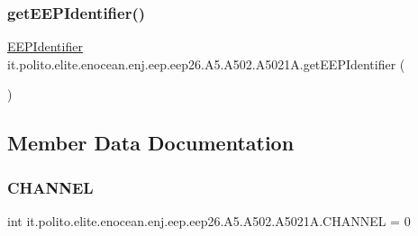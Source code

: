 \subsubsection{\texorpdfstring{get\+E\+E\+P\+Identifier()}{getEEPIdentifier()}}
{\footnotesize\ttfamily \hyperlink{classit_1_1polito_1_1elite_1_1enocean_1_1enj_1_1eep_1_1_e_e_p_identifier}{E\+E\+P\+Identifier} it.\+polito.\+elite.\+enocean.\+enj.\+eep.\+eep26.\+A5.\+A502.\+A5021\+A.\+get\+E\+E\+P\+Identifier (\begin{DoxyParamCaption}{ }\end{DoxyParamCaption})}



\subsection{Member Data Documentation}
\hypertarget{classit_1_1polito_1_1elite_1_1enocean_1_1enj_1_1eep_1_1eep26_1_1_a5_1_1_a502_1_1_a5021_a_a681331c7aa2e780e3ef77c34780dee58}{}\label{classit_1_1polito_1_1elite_1_1enocean_1_1enj_1_1eep_1_1eep26_1_1_a5_1_1_a502_1_1_a5021_a_a681331c7aa2e780e3ef77c34780dee58} 
\subsubsection{\texorpdfstring{C\+H\+A\+N\+N\+EL}{CHANNEL}}
{\footnotesize\ttfamily int it.\+polito.\+elite.\+enocean.\+enj.\+eep.\+eep26.\+A5.\+A502.\+A5021\+A.\+C\+H\+A\+N\+N\+EL = 0\hspace{0.3cm}{\ttfamily [static]}}

\hypertarget{classit_1_1polito_1_1elite_1_1enocean_1_1enj_1_1eep_1_1eep26_1_1_a5_1_1_a502_1_1_a5021_a_ab5dd84df89eb9d7f8c6e9b7981e0f284}{}\label{classit_1_1polito_1_1elite_1_1enocean_1_1enj_1_1eep_1_1eep26_1_1_a5_1_1_a502_1_1_a5021_a_ab5dd84df89eb9d7f8c6e9b7981e0f284} 
